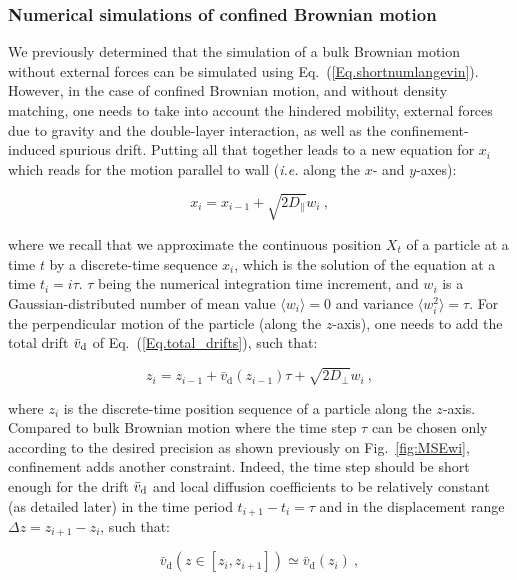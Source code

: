 \subsubsection{Numerical simulations of confined Brownian motion}
\label{sec:simconfined}
We previously determined that the simulation of a bulk Brownian motion without external forces can be simulated using Eq.~(\ref{Eq.shortnumlangevin}).
However, in the case of confined Brownian motion, and without density matching, one needs to take into account the hindered mobility, external forces due to gravity and the double-layer interaction, as well as the confinement-induced spurious drift. Putting all that together leads to a new equation for $x_i$ which reads for the motion parallel to wall (\textit{i.e.} along the $x$- and $y$-axes):

\begin{equation}
	x_i = x_{i-1} +  \sqrt{2D_\parallel}w_i ~,
	\label{eq.langevinnearx}
\end{equation}

where we recall that we approximate the continuous position $X_t$ of a particle at a time $t$ by a discrete-time sequence $x_i$, which is the solution of the equation at a time $t_i = i\tau$. $\tau$ being the numerical integration time increment, and $w_i$ is a Gaussian-distributed number of mean value $\langle w_i \rangle =0$ and variance $\langle w_i ^2\rangle = \tau$. For the perpendicular motion of the particle (along the $z$-axis), one needs to add the total drift $\bar{v}_\textnormal{d}$ of Eq.~(\ref{Eq.total_drifts}), such that:

\begin{equation}
	z_i = z_{i-1} + \bar{v}_\mathrm{d}(z_{i-1}) \tau + \sqrt{2D_\bot}w_i ~,
	\label{eq.langevinnearz}
\end{equation}

 where $z_i$ is the discrete-time position sequence of a particle along the $z$-axis. Compared to bulk Brownian motion where the time step $\tau$ can be chosen only according to the desired precision as shown previously on Fig.~\ref{fig:MSEwi}, confinement adds another constraint. Indeed, the time step should be short enough for the drift $\bar{v}_\textnormal{d}$ and local diffusion coefficients to be relatively constant (as detailed later) in the time period $t_{i+1} - t_i = \tau$ and in the displacement range $\Delta z = z_{i+1} - z_i$, such that:

\begin{equation}
	\bar{v}_\mathrm{d} (z \in [z_i, z_{i+1}]) \simeq \bar{v}_\mathrm{d} (z_i) ~,
	\label{driftc}
\end{equation}

